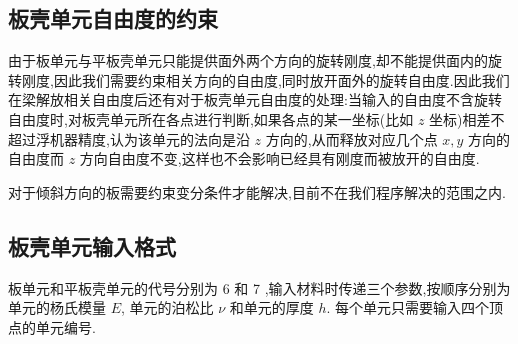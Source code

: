 \subsection{板壳单元自由度的约束}
由于板单元与平板壳单元只能提供面外两个方向的旋转刚度,却不能提供面内的旋转刚度,因此我们需要约束相关方向的自由度,同时放开面外的旋转自由度.因此我们在梁解放相关自由度后还有对于板壳单元自由度的处理:当输入的自由度不含旋转自由度时,对板壳单元所在各点进行判断,如果各点的某一坐标(比如 $z$ 坐标)相差不超过浮机器精度,认为该单元的法向是沿 $z$ 方向的,从而释放对应几个点 $x,y$ 方向的自由度而 $z$ 方向自由度不变,这样也不会影响已经具有刚度而被放开的自由度.

对于倾斜方向的板需要约束变分条件才能解决,目前不在我们程序解决的范围之内.

\subsection{板壳单元输入格式}
板单元和平板壳单元的代号分别为 6 和 7 ,输入材料时传递三个参数,按顺序分别为单元的杨氏模量 $E$, 单元的泊松比 $\nu$ 和单元的厚度 $h$. 每个单元只需要输入四个顶点的单元编号.

